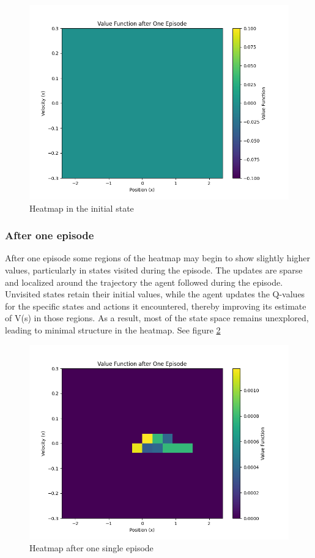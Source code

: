 \documentclass{article}
\begin{document}
\begin{figure}[h]
	\centering
	\includegraphics[width=0.5\linewidth]{../data/plot/heatmap_initial_training_constant_0.2.png}
	\caption{Heatmap in the initial state}
	\label{fig:heatmap_init}
\end{figure}

\subsubsection{After one episode}
After one episode some regions of the heatmap may begin to show slightly higher values, particularly in states visited during the episode. The updates are sparse and localized around the trajectory the agent followed during the episode. 
Unvisited states retain their initial values, while the agent updates the Q-values for the specific states and actions it encountered, thereby improving its estimate of  V(s)  in those regions.
As a result, most of the state space remains unexplored, leading to minimal structure in the heatmap. See figure \ref{fig:heatmap_costant_init}
\begin{figure}[h]
	\centering
	\includegraphics[width=0.5\linewidth]{../data/plot/heatmap_after_one_episode_constant_0.2.png}
	\caption{Heatmap after one single episode}
	\label{fig:heatmap_costant_init}
\end{figure}
\end{document}
